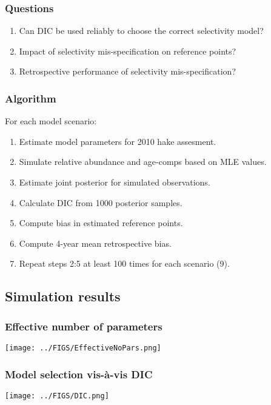 \documentclass{beamer}
\begin{document}
\begin{frame}[m]\frametitle{Questions}
    \begin{enumerate}
    	\item Can DIC be used reliably to choose the correct selectivity model?
    	\item Impact of selectivity mis-specification on reference points?
    	\item Retrospective performance of selectivity mis-specification?
    \end{enumerate}
\end{frame}

\begin{frame}[m]\frametitle{Algorithm}
    For each model scenario:
	\begin{enumerate}
		\item Estimate model parameters for 2010 hake assesment.
		\item Simulate relative abundance and age-comps based on MLE values.
		\item Estimate joint posterior for simulated observations.
		\item Calculate DIC from 1000 posterior samples.
		\item Compute bias in estimated reference points.
		\item Compute 4-year mean retrospective bias.
		\item Repeat steps 2:5 at least 100 times for each scenario (9).
	\end{enumerate}

\end{frame}

\subsection{Simulation results} %
\label{sub:simulation_results}

\begin{frame}[t]\frametitle{Effective number of parameters}
    
    \begin{center}
		\texttt{[image: ../FIGS/EffectiveNoPars.png]} 
    \end{center}

\end{frame}


\begin{frame}[t]\frametitle{Model selection vis-\`a-vis DIC}
    
\begin{center}
		\texttt{[image: ../FIGS/DIC.png]} 
    \end{center}

\end{frame}
\end{document}
